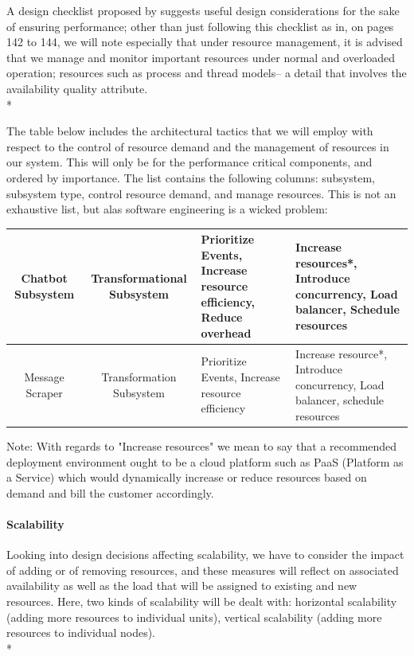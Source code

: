 \documentclass[11pt]{article}
\begin{document}
A design checklist proposed by \cite{Book:2} suggests useful design considerations for the sake of ensuring performance; other than just following this checklist as in, on pages 142 to 144, we will note especially that under resource management, it is advised that we manage and monitor important resources under normal and overloaded operation; resources such as process and thread models-- a detail that involves the availability quality attribute. \\*

The table below includes the architectural tactics that we will employ with respect to the control of resource demand and the management of resources in our system. This will only be for the performance critical components, and ordered by importance. The list contains the following columns: subsystem, subsystem type, control resource demand, and manage resources. This is not an exhaustive list, but alas software engineering is a wicked problem:
\begin{center}
	\begin{tabular}{|c|c|p{5cm}|p{6cm}|}
		\hline
		Chatbot Subsystem & Transformational Subsystem & Prioritize Events, Increase resource efficiency, Reduce overhead & Increase resources*, Introduce concurrency, Load balancer, Schedule resources \\
		\hline
		Message Scraper & Transformation Subsystem & Prioritize Events, Increase resource efficiency & Increase resource*, Introduce concurrency, Load balancer, schedule resources \\
		\hline
	\end{tabular}
\end{center}
Note: With regards to "Increase resources" we mean to say that a recommended deployment environment ought to be a cloud platform such as PaaS (Platform as a Service) which would dynamically increase or reduce resources based on demand and bill the customer accordingly.

\paragraph{Scalability}
Looking into design decisions affecting scalability, we have to consider the impact of adding or of removing resources, and these measures will reflect on associated availability as well as the load that will be assigned to existing and new resources\cite{Book:2}. Here, two kinds of scalability will be dealt with: horizontal scalability (adding more resources to individual units), vertical scalability (adding more resources to individual nodes).\\*
\end{document}
